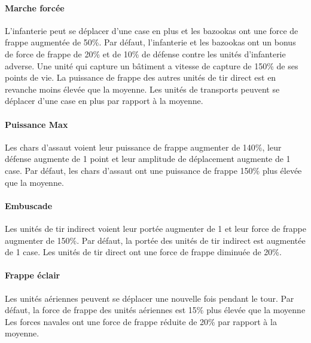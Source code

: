 \documentclass[12pt]{report}
\begin{document}
        \paragraph{Marche forcée}L'infanterie peut se déplacer d'une case en plus et les bazookas ont une force de frappe augmentée de 50\%.
        Par défaut, l'infanterie et les bazookas ont un bonus de force de frappe de 20\% et de 10\% de défense contre les unités d'infanterie adverse. Une unité qui capture un bâtiment a vitesse de capture de 150\% de ses points de vie.
        La puissance de frappe des autres unités de tir direct est en revanche moins élevée que la moyenne. Les unités de transports peuvent se déplacer d'une case en plus par rapport à la moyenne.
        
        \paragraph{Puissance Max}Les chars d'assaut voient leur puissance de frappe augmenter de 140\%, leur défense augmente de 1 point et leur amplitude de déplacement augmente de 1 case.
        Par défaut, les chars d'assaut ont une puissance de frappe 150\% plus élevée que la moyenne.
        
        \paragraph{Embuscade}Les unités de tir indirect voient leur portée augmenter de 1 et leur force de frappe augmenter de 150\%.
        Par défaut, la portée des unités de tir indirect est augmentée de 1 case. Les unités de tir direct ont une force de frappe diminuée de 20\%.
        
        \paragraph{Frappe éclair}Les unités aériennes peuvent se déplacer une nouvelle fois pendant le tour.
        Par défaut, la force de frappe des unités aériennes est 15\% plus élevée que la moyenne Les forces navales ont une force de frappe réduite de 20\% par rapport à la moyenne.
        
\end{document}
